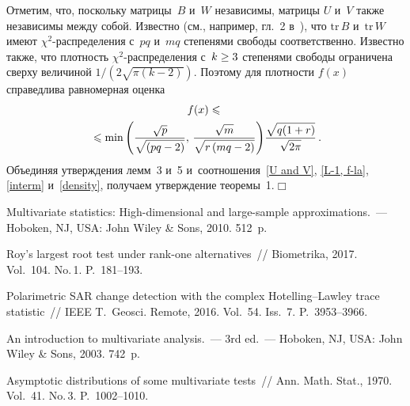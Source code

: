 \begin{multicols}{2}
Отметим, что, поскольку матрицы~$B$ и~$W$ независимы, матрицы $U$ и~$V$ также 
независимы между собой. Известно (см., например, гл.~2 в~\cite{lit:FUS01}), что 
$\mathrm{tr}\, B$ и~$\mathrm{tr}\, W$ имеют $\chi^{2}$-рас\-пре\-де\-ле\-ния с~$pq$ и~$mq$ степенями свободы 
соответственно. Известно также, что плотность $\chi^{2}$-распределения с~$k\hm\geq 3$ степенями свободы ограничена сверху величиной
$1/(2\sqrt{\pi\left(k-2\right)}).$
Поэтому для плотности $f(x)$ справедлива равномерная оценка
\begin{multline}
\label{density}
f(x) \leqslant{}\\
\hspace*{-1.5mm}{}\leqslant \min{\left( \displaystyle\frac{\displaystyle \sqrt{p}\mathstrut}{\displaystyle  \sqrt{ \left(pq-
2\right)}\mathstrut},\,\displaystyle\frac{\displaystyle \sqrt{m}\mathstrut}{\displaystyle \sqrt{r\left(mq-2\right)}\mathstrut}\right)} 
\displaystyle\frac{\displaystyle \sqrt{q(1+r)}\mathstrut}{\displaystyle \sqrt{2\pi}\mathstrut}\,.\!\!\!
\end{multline}
Объединяя утверждения лемм~3 и~5 и~соотношения~\eqref{U and V}, \eqref{L-1, f-la}, \eqref{interm} 
и~\eqref{density}, получаем утверждение теоремы~1.\hfill $\Box$%



{\small\frenchspacing
{%
\begin{thebibliography}{99}

  Multivariate statistics: High-dimensional 
and large-sample approximations.~--- Hoboken, NJ, USA: John Wiley \& Sons, 2010. 512~p.

 Roy's largest root test under rank-one 
alternatives~// Biometrika, 2017. Vol.~104. No.\,1. P.~181--193.

Polarimetric SAR change detection with the complex Hotelling--Lawley 
trace statistic~// IEEE T.~Geosci. Remote,  2016. Vol.~54. Iss.~7. 
P.~3953--3966.

  An introduction to multivariate analysis.~--- 3rd ed.~--- Hoboken, NJ,
USA: John Wiley \& Sons,  2003. 742~p.

  Asymptotic distributions of some multivariate tests~// 
Ann. Math. Stat., 1970. Vol.~41. No.\,3. P.~1002--1010.


\end{thebibliography}}}
\end{multicols}
